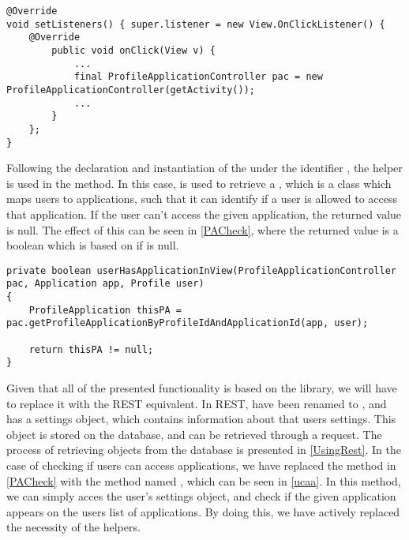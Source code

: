 \begin{minipage}[H]{\linewidth}
\begin{lstlisting}[caption = Declaration of the ProfileApplicationController which is used to retrieve information about ProfileApplications, label = pac]
@Override 
void setListeners() { super.listener = new View.OnClickListener() {
	@Override
    	public void onClick(View v) {
			...
            final ProfileApplicationController pac = new ProfileApplicationController(getActivity());
			...
    	}
	};
}
\end{lstlisting}
\end{minipage}

Following the declaration and instantiation of the
 under the identifier , the
helper is used in the  method. In this case,
 is used to retrieve a , which is a class
which maps users to applications, such that it can identify if a user is allowed
to access that application. If the user can't access the given application, the
returned value is null. The effect of this can be seen in \autoref{PACheck},
where the returned value is a boolean which is based on if  is
null.\nl

\begin{minipage}[H]{\linewidth}
\begin{lstlisting}[caption = Method which checks if a user is allowed to access an application, label = PACheck] 
private boolean userHasApplicationInView(ProfileApplicationController pac, Application app, Profile user) 
{ 
	ProfileApplication thisPA = pac.getProfileApplicationByProfileIdAndApplicationId(app, user);

    return thisPA != null;
}
\end{lstlisting}
\end{minipage}

Given that all of the presented functionality is based on the 
library, we will have to replace it with the REST equivalent. In REST,
 have been renamed to , and has a settings object,
which contains information about that users settings. This object is stored on
the database, and can be retrieved through a request. The process of retrieving
objects from the database is presented in \autoref{UsingRest}.
In the case of checking if users can access applications, we have replaced the
method in \autoref{PACheck} with the method named ,
which can be seen in \autoref{ucaa}. In this method, we can simply acces the
user's settings object, and check if the given application appears on the users
list of applications. By doing this, we have actively replaced the
necessity of the  helpers.\nl


